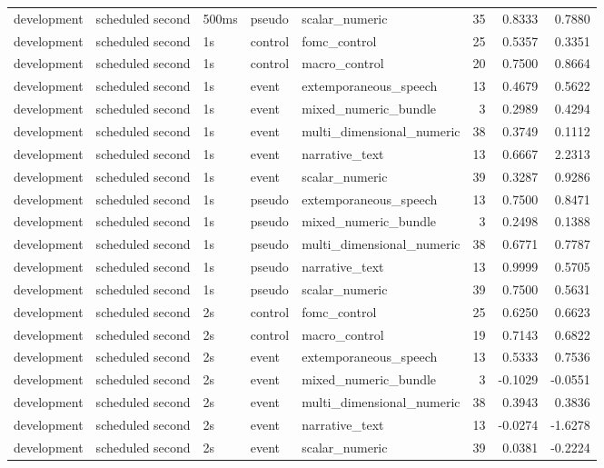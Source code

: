 \begin{tabular}{lllllrrr}
development & scheduled second & 500ms & pseudo & scalar_numeric & 35 & 0.8333 & 0.7880 \\
development & scheduled second & 1s & control & fomc_control & 25 & 0.5357 & 0.3351 \\
development & scheduled second & 1s & control & macro_control & 20 & 0.7500 & 0.8664 \\
development & scheduled second & 1s & event & extemporaneous_speech & 13 & 0.4679 & 0.5622 \\
development & scheduled second & 1s & event & mixed_numeric_bundle & 3 & 0.2989 & 0.4294 \\
development & scheduled second & 1s & event & multi_dimensional_numeric & 38 & 0.3749 & 0.1112 \\
development & scheduled second & 1s & event & narrative_text & 13 & 0.6667 & 2.2313 \\
development & scheduled second & 1s & event & scalar_numeric & 39 & 0.3287 & 0.9286 \\
development & scheduled second & 1s & pseudo & extemporaneous_speech & 13 & 0.7500 & 0.8471 \\
development & scheduled second & 1s & pseudo & mixed_numeric_bundle & 3 & 0.2498 & 0.1388 \\
development & scheduled second & 1s & pseudo & multi_dimensional_numeric & 38 & 0.6771 & 0.7787 \\
development & scheduled second & 1s & pseudo & narrative_text & 13 & 0.9999 & 0.5705 \\
development & scheduled second & 1s & pseudo & scalar_numeric & 39 & 0.7500 & 0.5631 \\
development & scheduled second & 2s & control & fomc_control & 25 & 0.6250 & 0.6623 \\
development & scheduled second & 2s & control & macro_control & 19 & 0.7143 & 0.6822 \\
development & scheduled second & 2s & event & extemporaneous_speech & 13 & 0.5333 & 0.7536 \\
development & scheduled second & 2s & event & mixed_numeric_bundle & 3 & -0.1029 & -0.0551 \\
development & scheduled second & 2s & event & multi_dimensional_numeric & 38 & 0.3943 & 0.3836 \\
development & scheduled second & 2s & event & narrative_text & 13 & -0.0274 & -1.6278 \\
development & scheduled second & 2s & event & scalar_numeric & 39 & 0.0381 & -0.2224 \\

\end{tabular}
